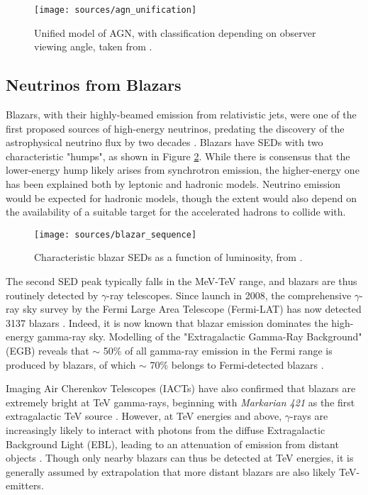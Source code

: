 \begin{figure}[!ht]
	\centering \texttt{[image: sources/agn\_unification]}
	\caption{Unified model of AGN, with classification depending on observer viewing angle, taken from \cite{2012agn..book.....B}.}
	\label{fig:agn_unification}
\end{figure}

\subsection*{Neutrinos from Blazars}
Blazars, with their highly-beamed emission from relativistic jets, were one of the first proposed sources of high-energy neutrinos, predating the discovery of the astrophysical neutrino flux by two decades . Blazars have SEDs with two characteristic "humps", as shown in Figure \ref{fig:blazar_sequence}. While there is consensus that the lower-energy hump likely arises from synchrotron emission,  the higher-energy one has been explained both by leptonic and hadronic models. Neutrino emission would be expected for hadronic models, though the extent would also depend on the availability of a suitable target for the accelerated hadrons to collide with.

\begin{figure}[!ht]
	\centering \texttt{[image: sources/blazar\_sequence]}
	\caption{Characteristic blazar SEDs as a function of luminosity, from \cite{16_blazar_sequence}.}
	\label{fig:blazar_sequence}
\end{figure}

The second SED peak typically falls in the MeV-TeV range, and blazars are thus routinely detected by $\gamma$-ray telescopes. Since launch in 2008, the comprehensive $\gamma$-ray sky survey by the Fermi Large Area Telescope (Fermi-LAT) has now detected 3137 blazars . Indeed, it is now known that blazar emission dominates the high-energy gamma-ray sky. Modelling of the "Extragalactic Gamma-Ray Background" (EGB) reveals that $\sim$ 50\% of all gamma-ray emission in the Fermi range is produced by blazars, of which $\sim$ 70\% belongs to Fermi-detected blazars .  

Imaging Air Cherenkov Telescopes (IACTs) have also confirmed that blazars are extremely bright at TeV gamma-rays, beginning with \emph{Markarian 421} as the first extragalactic TeV source . However, at TeV energies and above, $\gamma$-rays are increasingly likely to interact with photons from the diffuse Extragalactic Background Light (EBL), leading to an attenuation of emission from distant objects . Though only nearby blazars can thus be detected at TeV energies, it is generally assumed by extrapolation that more distant blazars are also likely TeV-emitters.

